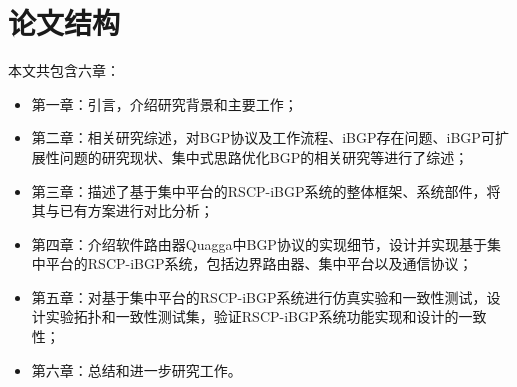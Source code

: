 \section{论文结构}
本文共包含六章：
\begin{itemize}
\item 第一章：引言，介绍研究背景和主要工作；
\item 第二章：相关研究综述，对BGP协议及工作流程、iBGP存在问题、iBGP可扩展性问题的研究现状、集中式思路优化BGP的相关研究等进行了综述；
\item 第三章：描述了基于集中平台的RSCP-iBGP系统的整体框架、系统部件，将其与已有方案进行对比分析；
\item 第四章：介绍软件路由器Quagga中BGP协议的实现细节，设计并实现基于集中平台的RSCP-iBGP系统，包括边界路由器、集中平台以及通信协议；
\item 第五章：对基于集中平台的RSCP-iBGP系统进行仿真实验和一致性测试，设计实验拓扑和一致性测试集，验证RSCP-iBGP系统功能实现和设计的一致性；
\item 第六章：总结和进一步研究工作。
\end{itemize}

